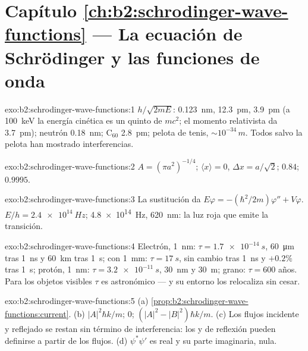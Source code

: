 \section*{Capítulo \ref{ch:b2:schrodinger-wave-functions} --- La ecuación de Schrödinger y las funciones de onda}

\begin{solution}{exo:b2:schrodinger-wave-functions:1}
$h/\sqrt{2mE}$: \qty{0.123}{nm}, \qty{12.3}{pm}, \qty{3.9}{pm} (a \qty{100}{keV} la
energía cinética es un quinto de $mc^2$; el momento relativista da
\qty{3.7}{pm}); neutrón \qty{0.18}{nm}; C$_{60}$ \qty{2.8}{pm}; pelota de tenis,
$\sim 10^{-34}\,\unit{m}$. Todos salvo la pelota han mostrado interferencias.
\end{solution}

\begin{solution}{exo:b2:schrodinger-wave-functions:2}
$A = (\pi a^2)^{-1/4}$; $\langle x\rangle = 0$, $\Delta x = a/\sqrt2$; $0.84$; $0.9995$.
\end{solution}

\begin{solution}{exo:b2:schrodinger-wave-functions:3}
La sustitución da $E\varphi = -(\hbar^2/2m)\varphi'' + V\varphi$. $E/h =
\qty{2.4e14}{Hz}$; \qty{4.8e14}{Hz}, \qty{620}{nm}: la luz roja que emite la
transición.
\end{solution}

\begin{solution}{exo:b2:schrodinger-wave-functions:4}
Electrón, \qty{1}{nm}: $\tau = \qty{1.7e-14}{s}$, \qty{60}{\micro m} tras \qty{1}{ns} y
\qty{60}{km} tras \qty{1}{s}; con \qty{1}{mm}: $\tau = \qty{17}{s}$, sin cambio tras \qty{1}{ns} y
$+0.2\%$ tras \qty{1}{s}; protón, \qty{1}{nm}: $\tau = \qty{3.2e-11}{s}$, \qty{30}{nm} y
\qty{30}{m}; grano: $\tau = 600$ años. Para los objetos visibles $\tau$ es
astronómico --- y su entorno los relocaliza sin cesar.
\end{solution}

\begin{solution}{exo:b2:schrodinger-wave-functions:5}
(a) \cref{prop:b2:schrodinger-wave-functions:current}. (b) $|A|^2\hbar k/m$;
$0$; $(|A|^2 - |B|^2)\hbar k/m$. (c) Los flujos incidente y reflejado se
restan sin término de interferencia: los  y de
reflexión pueden definirse a partir de los flujos. (d) $\psi^*\psi'$ es real y su
parte imaginaria, nula.
\end{solution}

